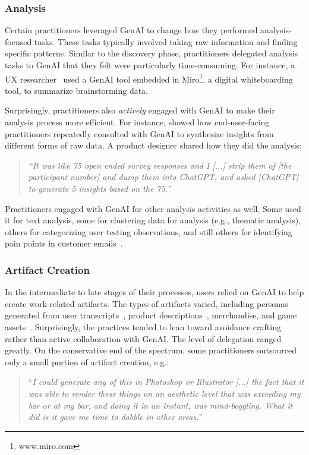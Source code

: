 \subsubsection{Analysis} Certain practitioners leveraged GenAI to change how they performed analysis-focused tasks. These tasks typically involved taking raw information and finding specific patterns. Similar to the discovery phase, practitioners delegated analysis tasks to GenAI that they felt were particularly time-consuming. For instance, a UX researcher~\cite{10} used a GenAI tool embedded in Miro\footnote{www.miro.com},
a digital whiteboarding tool, to summarize brainstorming data.

Surprisingly, practitioners also \textit{actively} engaged with GenAI to make their analysis process more efficient. For instance, \cite{10} showed how end-user-facing practitioners repeatedly consulted with GenAI to synthesize insights from different forms of raw data. A product designer shared how they did the analysis:

\begin{quote}
    \textit{``It was like 75 open ended survey responses and I [...] strip them of [the participant number] and dump them into ChatGPT, and asked [ChatGPT] to generate 5 insights based on the 75.'' }
\end{quote}

Practitioners engaged with GenAI for other analysis activities as well. Some used it for text analysis, some for clustering data for analysis (e.g., thematic analysis), others for categorizing user testing observations, and still others for identifying pain points in customer emails~\cite{21}.

\subsubsection{Artifact Creation} 
In the intermediate to late stages of their processes, users relied on GenAI to help create work-related artifacts. The types of artifacts varied, including personas generated from user transcripts~\cite{21}, product descriptions~\cite{21}, merchandise, and game assets~\cite{20}. Surprisingly, the practices tended to lean toward avoidance crafting rather than active collaboration with GenAI. The level of delegation ranged greatly. On the conservative end of the spectrum, some practitioners outsourced only a small portion of artifact creation, e.g.: 

\begin{quote}
``\textit{I could generate any of this in Photoshop or Illustrator [...] the fact that it was able to render these things on an aesthetic level that was exceeding my bar or at my bar, and doing it in an instant, was mind-boggling. What it did is it gave me time to dabble in other areas.}''~\cite{6}
\end{quote}

